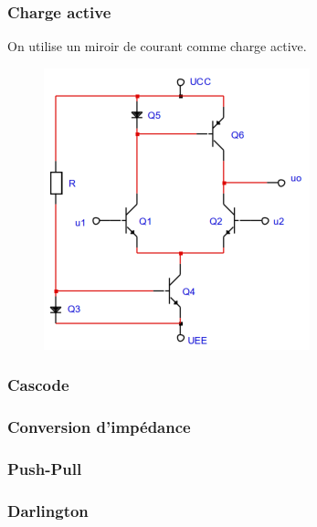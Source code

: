 \documentclass[resume]{subfiles}
\begin{document}
\begin{multicols}{3}
\subsubsection{Charge active}
On utilise un miroir de courant comme charge active.
\begin{figure}[H]
    \centering
    \includegraphics[width=0.5\columnwidth]{../images/OpAmp1/m_chrgact.png}
\end{figure}

\subsubsection{Cascode}

\subsubsection{Conversion d'impédance}

\subsubsection{Push-Pull}

\subsubsection{Darlington}

\end{multicols}
\end{document}

